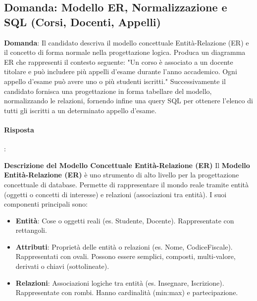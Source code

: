 
\subsection*{Domanda: Modello ER, Normalizzazione e SQL (Corsi, Docenti, Appelli)}

\textbf{Domanda}: Il candidato descriva il modello concettuale Entità-Relazione (ER) e il concetto di forma normale nella progettazione logica. Produca un diagramma ER che rappresenti il contesto seguente: "Un corso è associato a un docente titolare e può includere più appelli d'esame durante l'anno accademico. Ogni appello d'esame può avere uno o più studenti iscritti." Successivamente il candidato fornisca una progettazione in forma tabellare del modello, normalizzando le relazioni, fornendo infine una query SQL per ottenere l'elenco di tutti gli iscritti a un determinato appello d'esame.

\paragraph{Risposta}:

\textbf{Descrizione del Modello Concettuale Entità-Relazione (ER)}
Il \textbf{Modello Entità-Relazione (ER)} è uno strumento di alto livello per la progettazione concettuale di database. Permette di rappresentare il mondo reale tramite entità (oggetti o concetti di interesse) e relazioni (associazioni tra entità). I suoi componenti principali sono:
\begin{itemize}
    \item \textbf{Entità}: Cose o oggetti reali (es. Studente, Docente). Rappresentate con rettangoli.
    \item \textbf{Attributi}: Proprietà delle entità o relazioni (es. Nome, CodiceFiscale). Rappresentati con ovali. Possono essere semplici, composti, multi-valore, derivati o chiavi (sottolineate).
    \item \textbf{Relazioni}: Associazioni logiche tra entità (es. Insegnare, Iscrizione). Rappresentate con rombi. Hanno cardinalità (min:max) e partecipazione.
\end{itemize}

